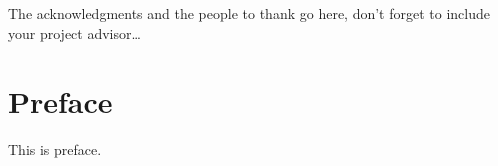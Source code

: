 \documentclass[
11pt, %
english, %
singlespacing, %
nolistspacing, %
liststotoc, %
toctotoc, %
parskip, %
headsepline, %
consistentlayout, %
]{MastersDoctoralThesis} %
\begin{document}
\setcounter{page}{7}

\begin{acknowledgements}
\addchaptertocentry{\acknowledgementname} %
The acknowledgments and the people to thank go here, don't forget to include your project advisor\ldots
\end{acknowledgements}

\cleardoublepage

%
\chapter*{Preface}

This is preface.

\cleardoublepage


\begin{CJK}{UTF8}{bkai}
\tableofcontents %
\end{CJK}

\listoffigures %

\listoftables %

\end{document}
